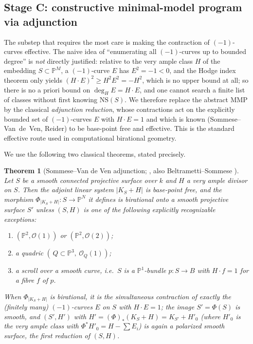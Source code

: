 \documentclass{amsart}
\theoremstyle{plain}
\newtheorem{theorem}{Theorem}
\theoremstyle{definition}
\newcommand{\PP}{\mathbb{P}}
\newcommand{\cO}{\mathcal{O}}
\begin{document}
\subsection{Stage C: constructive minimal-model program via adjunction}

The substep that requires the most care is making the contraction of
$(-1)$-curves effective.  The naive idea of ``enumerating all $(-1)$-curves up to
bounded degree'' is \emph{not} directly justified: relative to the very ample
class $H$ of the embedding $S\subset\PP^M$, a $(-1)$-curve $E$ has $E^2=-1<0$, and
the Hodge index theorem only yields $(H\cdot E)^2\ge H^2E^2=-H^2$, which is no
upper bound at all; so there is no a priori bound on $\deg_H E=H\cdot E$, and one
cannot search a finite list of classes without first knowing
$\mathrm{NS}(S)$.  We therefore replace the abstract MMP by the classical
\emph{adjunction reduction}, whose contractions act on the explicitly bounded set
of $(-1)$-curves $E$ with $H\cdot E=1$ and which is known (Sommese--Van~de~Ven,
Reider) to be base-point free and effective.  This is the standard effective
route used in computational birational geometry.

We use the following two classical theorems, stated precisely.

\begin{theorem}[Sommese--Van de Ven adjunction; {\cite[Thm.~I]{SVdV}},
also Beltrametti--Sommese {\cite[Ch.~1]{BS}}]\label{thm:svdv}
Let $S$ be a smooth connected projective surface over $k$ and $H$ a very ample
divisor on $S$.  Then the adjoint linear system $|K_S+H|$ is base-point free, and
the morphism $\Phi_{|K_S+H|}\colon S\to\PP^{N}$ it defines is birational onto a
smooth projective surface $S'$ \emph{unless} $(S,H)$ is one of the following
explicitly recognizable exceptions:
\begin{enumerate}
\item[(i)] $(\PP^2,\cO(1))$ or $(\PP^2,\cO(2))$;
\item[(ii)] a quadric $(\,Q\subset\PP^3,\ \cO_Q(1))$;
\item[(iii)] a scroll over a smooth curve, i.e.\ $S$ is a $\PP^1$-bundle
$p\colon S\to B$ with $H\cdot f=1$ for a fibre $f$ of $p$.
\end{enumerate}
When $\Phi_{|K_S+H|}$ is birational, it is the simultaneous contraction of
exactly the (finitely many) $(-1)$-curves $E$ on $S$ with $H\cdot E=1$; the image
$S'=\Phi(S)$ is smooth, and $(S',H')$ with $H'=(\Phi)_*(K_S+H)=K_{S'}+H'_0$
(where $H'_0$ is the very ample class with $\Phi^*H'_0=H-\sum E_i$) is again a
polarized smooth surface, the \emph{first reduction} of $(S,H)$.
\end{theorem}
\end{document}
